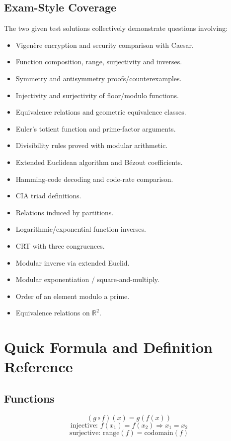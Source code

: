 \documentclass[12pt]{article}
\begin{document}
\subsection{Exam-Style Coverage}
The two given test solutions collectively demonstrate questions involving:
\begin{itemize}
    \item Vigen\`ere encryption and security comparison with Caesar.
    \item Function composition, range, surjectivity and inverses.
    \item Symmetry and antisymmetry proofs/counterexamples.
    \item Injectivity and surjectivity of floor/modulo functions.
    \item Equivalence relations and geometric equivalence classes.
    \item Euler's totient function and prime-factor arguments.
    \item Divisibility rules proved with modular arithmetic.
    \item Extended Euclidean algorithm and Bézout coefficients.
    \item Hamming-code decoding and code-rate comparison.
    \item CIA triad definitions.
    \item Relations induced by partitions.
    \item Logarithmic/exponential function inverses.
    \item CRT with three congruences.
    \item Modular inverse via extended Euclid.
    \item Modular exponentiation / square-and-multiply.
    \item Order of an element modulo a prime.
    \item Equivalence relations on $\mathbb R^2$.
\end{itemize}

\newpage
\section{Quick Formula and Definition Reference}

\subsection{Functions}
\[
(g\circ f)(x)=g(f(x))
\]
\[
\text{injective: }f(x_1)=f(x_2)\Rightarrow x_1=x_2
\]
\[
\text{surjective: range}(f)=\text{codomain}(f)
\]
\end{document}
